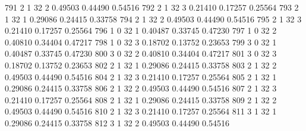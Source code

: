 \documentclass{article}
\begin{document}
\begin{Woutput}
 791      2       1      32       2       0.49503    0.44490    0.54516
 792      2       1      32       3       0.21410    0.17257    0.25564
 793      2       1      32       1       0.29086    0.24415    0.33758
 794      2       1      32       2       0.49503    0.44490    0.54516
 795      2       1      32       3       0.21410    0.17257    0.25564
 796      1       0      32       1       0.40487    0.33745    0.47230
 797      1       0      32       2       0.40810    0.34404    0.47217
 798      1       0      32       3       0.18702    0.13752    0.23653
 799      3       0      32       1       0.40487    0.33745    0.47230
 800      3       0      32       2       0.40810    0.34404    0.47217
 801      3       0      32       3       0.18702    0.13752    0.23653
 802      2       1      32       1       0.29086    0.24415    0.33758
 803      2       1      32       2       0.49503    0.44490    0.54516
 804      2       1      32       3       0.21410    0.17257    0.25564
 805      2       1      32       1       0.29086    0.24415    0.33758
 806      2       1      32       2       0.49503    0.44490    0.54516
 807      2       1      32       3       0.21410    0.17257    0.25564
 808      2       1      32       1       0.29086    0.24415    0.33758
 809      2       1      32       2       0.49503    0.44490    0.54516
 810      2       1      32       3       0.21410    0.17257    0.25564
 811      3       1      32       1       0.29086    0.24415    0.33758
 812      3       1      32       2       0.49503    0.44490    0.54516


\end{Woutput}
\end{document}
